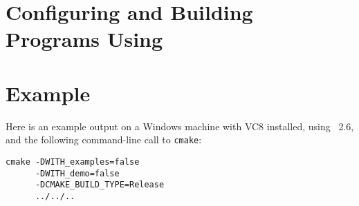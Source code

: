 \section{Configuring and Building Programs Using \cgal}


\section{Example} 

Here is an example output on a Windows machine with VC8 installed, using \cmake\ 2.6,
and the following command-line call to {\tt cmake}:

{\ccTexHtml{\scriptsize}{}
\begin{verbatim}
cmake -DWITH_examples=false 
      -DWITH_demo=false 
      -DCMAKE_BUILD_TYPE=Release 
      ../../..
\end{verbatim}
}


